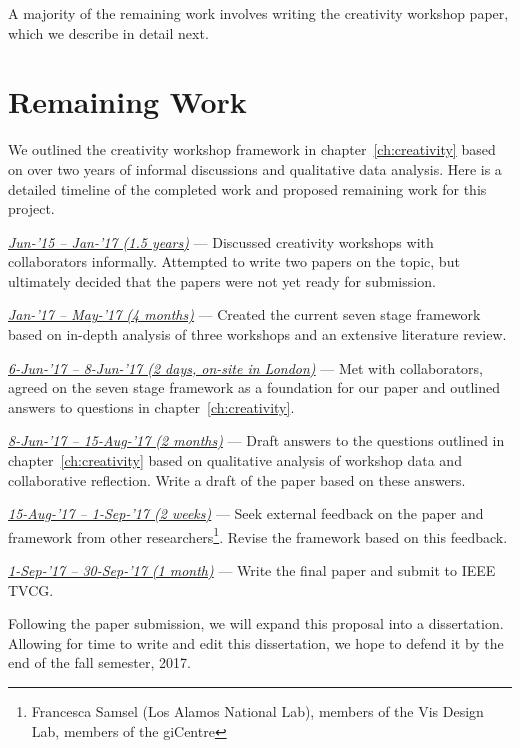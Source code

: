 A majority of the remaining work involves writing the creativity workshop paper, which we describe in detail next. 

\section{Remaining Work}

We outlined the creativity workshop framework in chapter~\ref{ch:creativity} based on over two years of informal discussions and qualitative data analysis. Here is a detailed timeline of the completed work and proposed remaining work for this project.

\begin{todolist}
 
    \item[\done] \underline{\emph{Jun-'15 -- Jan-'17  (1.5 years)}} --- Discussed creativity workshops with collaborators informally. Attempted to write two papers on the topic, but ultimately decided that the papers were not yet ready for submission.
    
    \item[\done] \underline{\emph{Jan-'17 -- May-'17  (4 months)}} --- Created the current seven stage framework based on in-depth analysis of three workshops and an extensive literature review. 
    
    \item[\done] \underline{\emph{6-Jun-'17 -- 8-Jun-'17  (2 days, on-site in London)}} --- Met with collaborators, agreed on the seven stage framework as a foundation for our paper and outlined answers to questions in chapter~\ref{ch:creativity}.
    
    \item \underline{\emph{8-Jun-'17 -- 15-Aug-'17 (2 months)}} --- Draft answers to the questions outlined in chapter~\ref{ch:creativity} based on qualitative analysis of workshop data and collaborative reflection. Write a draft of the paper based on these answers.
    
    \item \underline{\emph{15-Aug-'17 -- 1-Sep-'17  (2 weeks)}} --- Seek external feedback on the paper and framework from other researchers\footnote{Francesca Samsel (Los Alamos National Lab), members of the Vis Design Lab, members of the giCentre}. Revise the framework based on this feedback.
    
    \item \underline{\emph{1-Sep-'17 -- 30-Sep-'17  (1 month)}} --- Write the final paper and submit to IEEE TVCG.

\end{todolist}

Following the paper submission, we will expand this proposal into a dissertation. Allowing for time to write and edit this dissertation, we hope to defend it by the end of the fall semester, 2017. 

